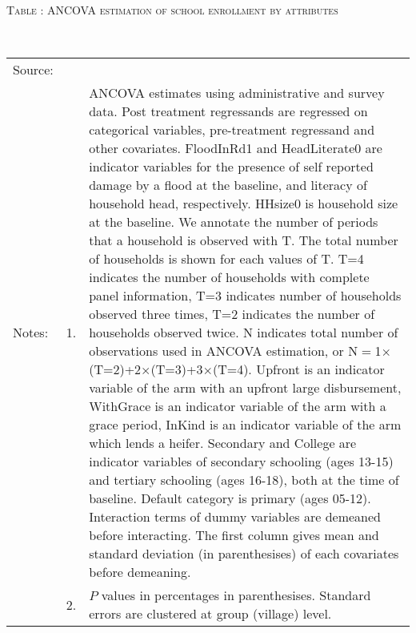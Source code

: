 \vspace{-1cm}
\hspace{-1cm}\begin{minipage}[t]{14cm}
\hfil\textsc{\normalsize Table \thetable: ANCOVA estimation of school enrollment by attributes\label{tab ANCOVA enroll attributes}}\\
\setlength{\tabcolsep}{1pt}
\setlength{\baselineskip}{8pt}
\renewcommand{\arraystretch}{.525}
\hfil{}\\
\renewcommand{\arraystretch}{.7}
\setlength{\tabcolsep}{1pt}
\hspace{-1cm}\begin{tabular}{>{\hfill\scriptsize}p{1cm}<{}>{\hfill\scriptsize}p{.25cm}<{}>{\scriptsize}p{14cm}<{\hfill}}
Source:& \multicolumn{2}{l}{\scriptsize Estimated with GUK administrative and survey data.}\\
Notes: & 1. & \begin{minipage}[t]{14cm}ANCOVA estimates using administrative and survey data. Post treatment regressands are regressed on categorical variables, pre-treatment regressand and other covariates. \textsf{FloodInRd1} and \textsf{HeadLiterate0} are indicator variables for the presence of self reported damage by a flood at the baseline, and literacy of household head, respectively. \textsf{HHsize0} is household size at the baseline. We annotate the number of periods that a household is observed with \textsf{T}. The total number of households is shown for each values of \textsf{T}. \textsf{T=4} indicates the number of households with complete panel information, \textsf{T=3} indicates number of households observed three times, \textsf{T=2} indicates the number of households observed twice. \textsf{N} indicates total number of observations used in ANCOVA estimation, or \textsf{N$=$1$\times$(T=2)+2$\times$(T=3)+3$\times$(T=4)}.  \textsf{Upfront} is an indicator variable of the arm with an upfront large disbursement, \textsf{WithGrace} is an indicator variable of the arm with a grace period, \textsf{InKind} is an indicator variable of the arm which lends a heifer. \textsf{Secondary} and \textsf{College} are indicator variables of secondary schooling (ages 13-15) and tertiary schooling (ages 16-18), both at the time of baseline. Default category is primary (ages 05-12). Interaction terms of dummy variables are demeaned before interacting. The first column gives mean and standard deviation (in parenthesises) of each covariates before demeaning. \setlength{\baselineskip}{2pt}\end{minipage}\\
& 2. & $P$ values in percentages in parenthesises. Standard errors are clustered at group (village) level.%
\end{tabular}
\end{minipage}

